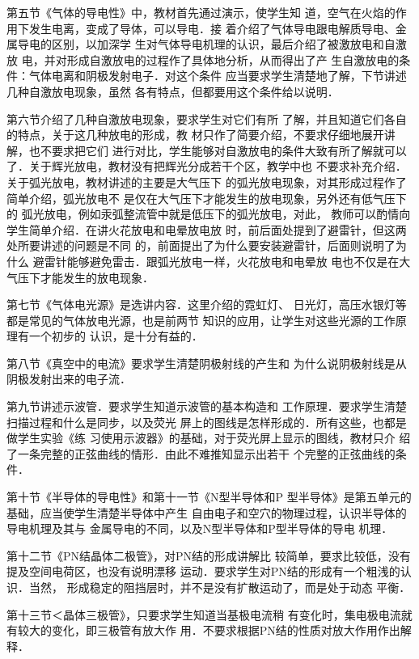 第五节《气体的导电性》中，教材首先通过演示，使学生知
道，空气在火焰的作用下发生电离，变成了导体，可以导电．接
着介绍了气体导电跟电解质导电、金属导电的区别，以加深学
生对气体导电机理的认识，最后介绍了被激放电和自激放
电，并对形成自激放电的过程作了具体地分析，从而得出了产
生自激放电的条件：气体电离和阴极发射电子．对这个条件
应当要求学生清楚地了解，下节讲述几种自激放电现象，虽然
各有特点，但都要用这个条件给以说明．

第六节介绍了几种自激放电现象，要求学生对它们有所
了解，并且知道它们各自的特点，关于这几种放电的形成，教
材只作了简要介绍，不要求仔细地展开讲解，也不要求把它们
进行对比，学生能够对自激放电的条件大致有所了解就可以
了．关于辉光放电，教材没有把辉光分成若干个区，教学中也
不要求补充介绍．关于弧光放电，教材讲述的主要是大气压下
的弧光放电现象，对其形成过程作了简单介绍，弧光放电不
是仅在大气压下才能发生的放电现象，另外还有低气压下的
弧光放电，例如汞弧整流管中就是低压下的弧光放电，对此，
教师可以酌情向学生简单介绍．在讲火花放电和电晕放电放
时，前后面处提到了避雷针，但这两处所要讲述的问题是不同
的，前面提出了为什么要安装避雷针，后面则说明了为什么
避雷针能够避免雷击．跟弧光放电一样，火花放电和电晕放
电也不仅是在大气压下才能发生的放电现象．

第七节《气体电光源》是选讲内容．这里介绍的霓虹灯、
日光灯，高压水银灯等都是常见的气体放电光源，也是前两节
知识的应用，让学生对这些光源的工作原理有一个初步的
认识，是十分有益的．

第八节《真空中的电流》要求学生清楚阴极射线的产生和
为什么说阴极射线是从阴极发射出来的电子流．

第九节讲述示波管．要求学生知道示波管的基本构造和
工作原理．要求学生清楚扫描过程和什么是同步，以及荧光
屏上的图线是怎样形成的．所有这些，也都是做学生实验《练
习使用示波器》的基础，对于荧光屏上显示的图线，教材只介
绍了一条完整的正弦曲线的情形．由此不难推知显示出若干
个完整的正弦曲线的条件．

第十节《半导体的导电性》和第十一节《N型半导体和P
型半导体》是第五单元的基础，应当使学生清楚半导体中产生
自由电子和空穴的物理过程，认识半导体的导电机理及其与
金属导电的不同，以及N型半导体和P型半导体的导电
机理．

第十二节《PN结晶体二极管》，对PN结的形成讲解比
较简单，要求比较低，没有提及空间电荷区，也没有说明漂移
运动．要求学生对PN结的形成有一个粗浅的认识．当然，
形成稳定的阻挡层时，并不是没有扩散运动了，而是处于动态
平衡．

第十三节＜晶体三极管》，只要求学生知道当基极电流稍
有变化时，集电极电流就有较大的变化，即三极管有放大作
用．不要求根据PN结的性质对放大作用作出解释．

